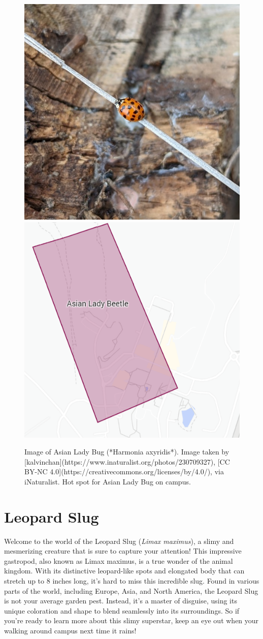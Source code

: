 \documentclass[
]{book}
\begin{document}
\begin{figure}

{\centering \includegraphics[width=0.49\linewidth,height=0.2\textheight]{insect_images/lady_11} \includegraphics[width=0.49\linewidth,height=0.2\textheight]{insect_images/lady_hotspot_11} 

}

\caption{Image of Asian Lady Bug (*Harmonia axyridis*). Image taken by [kalvinchan](https://www.inaturalist.org/photos/230709327), [CC BY-NC 4.0](https://creativecommons.org/licenses/by/4.0/), via iNaturalist. Hot spot for Asian Lady Bug on campus.}\label{fig:unnamed-chunk-8}
\end{figure}

\hypertarget{leopard-slug}{%
\section{Leopard Slug}\label{leopard-slug}}

Welcome to the world of the Leopard Slug (\emph{Limax maximus}), a slimy and mesmerizing creature that is sure to capture your attention! This impressive gastropod, also known as Limax maximus, is a true wonder of the animal kingdom. With its distinctive leopard-like spots and elongated body that can stretch up to 8 inches long, it's hard to miss this incredible slug. Found in various parts of the world, including Europe, Asia, and North America, the Leopard Slug is not your average garden pest. Instead, it's a master of disguise, using its unique coloration and shape to blend seamlessly into its surroundings. So if you're ready to learn more about this slimy superstar, keep an eye out when your walking around campus next time it rains!
\end{document}
